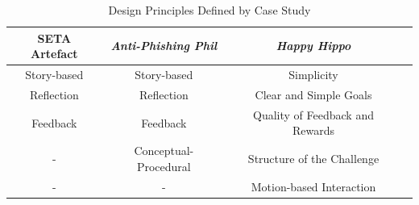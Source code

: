 \documentclass[conference]{IEEEtran}
\begin{document}
\begin{table}[h]
\caption{Design Principles Defined by Case Study \cite{Dincelli2020,Sheng2007,allers2021children}}
\begin{adjustwidth}{-0.5cm}{}
\begin{tabular}{|c|c|c|c|}
\hline

\textbf{SETA Artefact} & \textbf{\textit{Anti-Phishing Phil}}& \textbf{\textit{Happy Hippo}} \\
\hline
Story-based	& Story-based 			& Simplicity  \\
Reflection	& Reflection			& Clear and Simple Goals  \\
Feedback	& Feedback 				& Quality of Feedback and Rewards  \\
	-		& Conceptual-Procedural	& Structure of the Challenge  \\
	-		& 		-				& Motion-based Interaction  \\
\hline

\end{tabular}
\label{tab1}
\end{adjustwidth}
\end{table}
\end{document}
